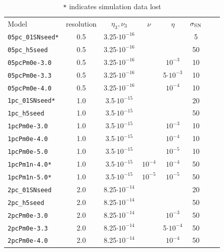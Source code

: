 \documentclass[iop,apj,numberedappendix,twocolappendix]{emulateapj}
\begin{document}
\begin{table}
\caption{\texttt{*} indicates simulation data lost}
\begin{tabular}{lccccccc}
Model & resolution & $\eta_3,\nu_3$ & $\nu$ & $\eta$ & $\sigma_{\rm SN}$ & \\
\texttt{05pc\_01SNseed*} & 0.5 & 3.25$\cdot10^{-16}$ &                  &                 &  5   \\
\texttt{05pc\_h5seed  }  & 0.5 & 3.25$\cdot10^{-16}$ &                  &                 &  50  \\
\texttt{05pcPm0e-3.0 }   & 0.5 & 3.25$\cdot10^{-16}$ &                  & $     10^{-3}$  &  10  \\
\texttt{05pcPm0e-3.3 }   & 0.5 & 3.25$\cdot10^{-16}$ &                  & 5$\cdot10^{-3}$ &  10  \\
\texttt{05pcPm0e-4.0 }   & 0.5 & 3.25$\cdot10^{-16}$ &                  & $     10^{-4}$  &  10  \\
\texttt{1pc\_01SNseed*}  & 1.0 & 3.5$\cdot10^{-15}$  &                  &                 &  20  \\
\texttt{1pc\_h5seed   }  & 1.0 & 3.5$\cdot10^{-15}$  &                  &                 &  50  \\
\texttt{1pcPm0e-3.0  }   & 1.0 & 3.5$\cdot10^{-15}$  &                  & $     10^{-3}$  &  10  \\
\texttt{1pcPm0e-4.0  }   & 1.0 & 3.5$\cdot10^{-15}$  &                  & $     10^{-4}$  &  10  \\
\texttt{1pcPm0e-5.0  }   & 1.0 & 3.5$\cdot10^{-15}$  &                  & $     10^{-5}$  &  10  \\
\texttt{1pcPm1n-4.0* }   & 1.0 & 3.5$\cdot10^{-15}$  & $     10^{-4}$   & $     10^{-4}$  &  50  \\
\texttt{1pcPm1n-5.0* }   & 1.0 & 3.5$\cdot10^{-15}$  & $     10^{-5}$   & $     10^{-5}$  &  50  \\
\texttt{2pc\_01SNseed }  & 2.0 & 8.25$\cdot10^{-14}$ &                  &                 &  20  \\
\texttt{2pc\_h5seed   }  & 2.0 & 8.25$\cdot10^{-14}$ &                  &                 &  50  \\
\texttt{2pcPm0e-3.0  }   & 2.0 & 8.25$\cdot10^{-14}$ &                  & $     10^{-3}$  &  50  \\
\texttt{2pcPm0e-3.3  }   & 2.0 & 8.25$\cdot10^{-14}$ &                  & 5$\cdot10^{-4}$ &  50  \\
\texttt{2pcPm0e-4.0  }   & 2.0 & 8.25$\cdot10^{-14}$ &                  & $     10^{-4}$  &  50  \\

\end{tabular}
\end{table}
\end{document}
